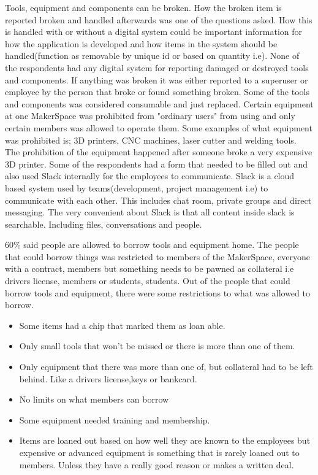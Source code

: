 Tools, equipment and components can be broken. How the broken item is reported broken and handled afterwards was one of the questions asked. How this is handled with or without a digital system could be important information for how the application is developed and how items in the system should be handled(function as removable by unique id or based on quantity i.e). 
None of the respondents had any digital system for reporting damaged or destroyed tools and components. If anything was broken it was either reported to a superuser or employee by the person that broke or found something broken. Some of the tools and components was considered consumable and just replaced. Certain equipment at one MakerSpace was prohibited from "ordinary users" from using and only certain members was allowed to operate them. Some examples of what equipment was prohibited is; 3D printers, CNC machines, laser cutter and welding tools. The prohibition of the equipment happened after someone broke a very expensive 3D printer. 
Some of the respondents had a form that needed to be filled out and also used Slack internally for the employees to communicate. Slack is a cloud based system used by teams(development, project management i.e) to communicate with each other\cite{Slack_Software}. This includes chat room, private groups and direct messaging. The very convenient about Slack is that all content inside slack is searchable. Including files, conversations and people\cite{what_is_slack}.

60\% said people are allowed to borrow tools and equipment home. The people that could borrow things was restricted to members of the MakerSpace, everyone with a contract, members but something needs to be pawned as collateral i.e drivers license, members or students, students. Out of the people that could borrow tools and equipment, there were some restrictions to what was allowed to borrow.    

\begin{itemize}
    \item Some items had a chip that marked them as loan able.
    \item Only small tools that won't be missed or there is more than one of them.
    \item Only equipment that there was more than one of, but collateral had to be left behind. Like a drivers license,keys or bankcard.
    \item No limits on what members can borrow
    \item Some equipment needed training and membership.
    \item Items are loaned out based on how well they are known to the employees but expensive or advanced equipment is something that is rarely loaned out to members. Unless they have a really good reason or makes a written deal.
\end{itemize}

